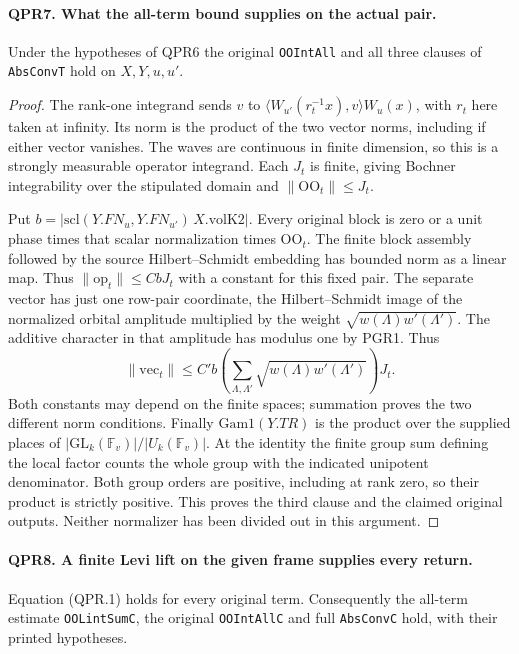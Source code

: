 \paragraph{QPR7. What the all-term bound supplies on the actual pair.}
Under the hypotheses of QPR6 the original \texttt{OOIntAll} and all
three clauses of \texttt{AbsConvT} hold on \(X,Y,u,u'\).
\begin{proof}
The rank-one integrand sends \(v\) to
\(\langle W_{u'}(r_t^{-1}x),v\rangle W_u(x)\), with \(r_t\)
here taken at infinity. Its norm is the product of the two vector
norms, including if either vector vanishes. The waves are continuous
in finite dimension, so this is a strongly measurable operator
integrand. Each \(J_t\) is finite, giving Bochner integrability over
the stipulated domain and \(\|\mathrm{OO}_t\|\le J_t\).

Put \(b=|\mathrm{scl}(Y.FN_u,Y.FN_{u'})\,X.\mathrm{volK2}|\).
Every original block is zero or a unit phase times that scalar
normalization times \(\mathrm{OO}_t\). The finite block assembly
followed by the source Hilbert--Schmidt embedding has bounded norm
as a linear map. Thus \(\|\mathrm{op}_t\|\le C b J_t\) with a
constant for this fixed pair. The separate vector has just one
row-pair coordinate, the Hilbert--Schmidt image of the normalized
orbital amplitude multiplied by the weight
\(\sqrt{w(\Lambda)w'(\Lambda')}\). The additive character in that
amplitude has modulus one by PGR1. Thus
\[
 \|\mathrm{vec}_t\|
  \le C' b\left(\sum_{\Lambda,\Lambda'}
                  \sqrt{w(\Lambda)w'(\Lambda')}\right)J_t .
\]
Both constants may depend on the finite spaces; summation proves
the two different norm conditions. Finally \(\mathrm{Gam1}(Y.TR)\)
is the product over the supplied places of
\( |\mathrm{GL}_k(\mathbb F_v)|/|U_k(\mathbb F_v)| \).
At the identity the finite group sum defining the local factor
counts the whole group with the indicated unipotent denominator.
Both group orders are positive, including at rank zero, so their
product is strictly positive. This proves the third clause and the
claimed original outputs. Neither normalizer has been divided out
in this argument.
\end{proof}

\paragraph{QPR8. A finite Levi lift on the given frame supplies every return.}
Equation (QPR.1) holds for every original term. Consequently the
all-term estimate \texttt{OOLintSumC}, the original \texttt{OOIntAllC}
and full \texttt{AbsConvC} hold, with their printed hypotheses.

